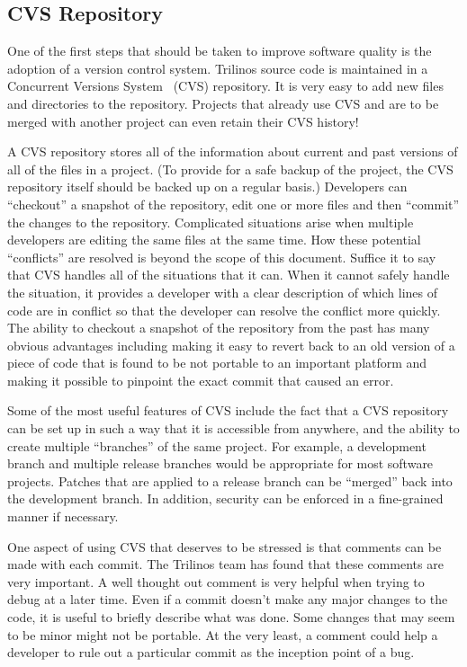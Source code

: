 \documentclass[12pt,relax]{article}
\begin{document}

\subsection{CVS Repository}

One of the first steps that should be taken to improve software quality is the 
adoption of a version control system.  Trilinos source code is maintained in a 
Concurrent Versions System~\cite{CVS}
(CVS) repository.  It is very easy to add new files and directories to
the repository.  Projects that already use CVS and are to be merged with 
another project can even retain their CVS history!

A CVS repository stores all of the information about current and past versions
of all of the files in a project.  (To provide for a safe backup of the 
project, the CVS repository itself should be backed up on a regular basis.)  
Developers can ``checkout'' a snapshot of 
the repository, edit one or more files and then ``commit'' the changes to the
repository.  Complicated situations arise when multiple developers are 
editing the same files at the same time.  How these potential ``conflicts'' 
are resolved is beyond the scope of this document.  Suffice it to say that 
CVS handles all of the situations that it can.  When it cannot safely handle 
the situation, it provides a developer with a clear description of which 
lines of code are in conflict so that the developer can resolve the 
conflict more quickly.  The ability to checkout a snapshot of the 
repository from the past has many obvious advantages including making it easy 
to revert back to an old version of a piece of code that is found to be not 
portable to an important platform and making it possible to pinpoint the exact 
commit that caused an error.

Some of the most useful features of CVS include the fact that a CVS 
repository can be set up in such a way that it is accessible from anywhere, 
and the ability to create multiple ``branches'' of the same project.  For 
example, a development branch and multiple release branches would be 
appropriate for most software projects.  Patches that are applied 
to a release branch can be ``merged'' back into the development branch.  
In addition, security can be enforced in a fine-grained manner if necessary.  

One aspect of using CVS that deserves to be stressed is that comments can be 
made with each commit.  The Trilinos team has found that these comments are 
very important.  A well thought out comment is very helpful when trying to 
debug at a later time.  Even if a commit doesn't make any major changes to the 
code, it is useful to briefly describe what was done.  Some changes that may 
seem to be minor might not be portable.  At the very least, a comment could 
help a developer to rule out a particular commit as the inception point 
of a bug.
\end{document}
